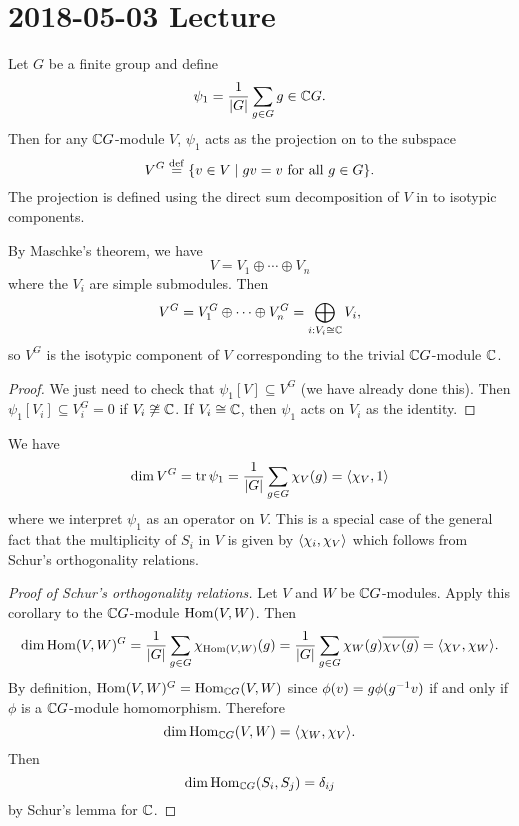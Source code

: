 \section{2018-05-03 Lecture}

\begin{prop}
  Let $G$ be a finite group and define
  \[\psi_1 = \frac{1}{\left\lvert G \right\rvert} \sum_{g \in G} g \in \mathbb{C} G.\]
  Then for any $\mathbb{C} G$-module $V$, $\psi_1$ acts as the projection on to the subspace
  \[V^G \overset{\mathrm{def}}{=} \{v \in V \mid gv=v \text{ for all } g \in G\}.\]
  The projection is defined using the direct sum decomposition of $V$ in to isotypic components.
\end{prop}

\begin{rmk}
  By Maschke's theorem, we have
  \[V = V_1 \oplus \cdots \oplus V_n\]
  where the $V_i$ are simple submodules.
  Then
  \[V^G = V_1^G \oplus \cdots \oplus V_n^G = \bigoplus_{i: V_i \cong \mathbb{C}} V_i,\]
  so $V^G$ is the isotypic component of $V$ corresponding to the trivial $\mathbb{C} G$-module $\mathbb{C}$.
\end{rmk}

\begin{proof}
  We just need to check that $\psi_1[V] \subseteq V^G$ (we have already done this).
  Then $\psi_1[V_i] \subseteq V_i^G = 0$ if $V_i \not\cong \mathbb{C}$.
  If $V_i \cong \mathbb{C}$, then $\psi_1$ acts on $V_i$ as the identity.
\end{proof}

\begin{cor}
  We have
  \[\dim V^G = \operatorname{tr}\psi_1 = \frac{1}{\left\lvert G \right\rvert}\sum_{g \in G}\chi_V(g) = {\left\langle \chi_V,1 \right\rangle}\]
  where we interpret $\psi_1$ as an operator on $V$.
  This is a special case of the general fact that the multiplicity of $S_i$ in $V$ is given by ${\left\langle \chi_i,\chi_V \right\rangle}$ which follows from Schur's orthogonality relations.
\end{cor}

\begin{proof}[Proof of Schur's orthogonality relations]
  Let $V$ and $W$ be $\mathbb{C} G$-modules.
  Apply this corollary to the $\mathbb{C} G$-module $\operatorname{Hom}(V,W)$.
  Then
  \[\dim \operatorname{Hom}(V,W)^G = \frac{1}{\left\lvert G \right\rvert} \sum_{g \in G} \chi_{\operatorname{Hom}(V,W)}(g) = \frac{1}{\left\lvert G \right\rvert} \sum_{g \in G} \chi_W(g) \overline{\chi_V(g)} = {\left\langle \chi_V,\chi_W \right\rangle}.\]
  By definition, $\operatorname{Hom}(V,W)^G = \operatorname{Hom}_{\mathbb{C} G}(V,W)$ since $\phi(v) = g\phi(g^{-1} v)$ if and only if $\phi$ is a $\mathbb{C} G$-module homomorphism.
  Therefore
  \[\dim \operatorname{Hom}_{\mathbb{C} G}(V,W) = {\left\langle \chi_W,\chi_V \right\rangle}.\]
  Then
  \[\dim \operatorname{Hom}_{\mathbb{C} G}(S_i,S_j) = \delta_{ij}\]
  by Schur's lemma for $\mathbb{C}$.
\end{proof}

